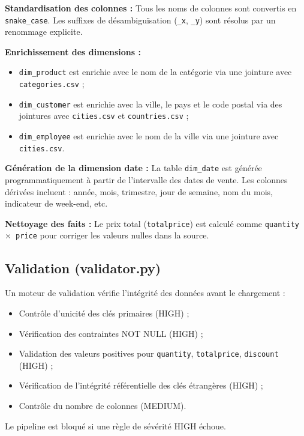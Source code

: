 \documentclass[12pt,a4paper,twoside]{report}
\begin{document}
\textbf{Standardisation des colonnes :} Tous les noms de colonnes sont convertis en \texttt{snake\_case}. Les suffixes de désambiguïsation (\texttt{\_x}, \texttt{\_y}) sont résolus par un renommage explicite.

\textbf{Enrichissement des dimensions :}
\begin{itemize}
  \item \texttt{dim\_product} est enrichie avec le nom de la catégorie via une jointure avec \texttt{categories.csv} ;
  \item \texttt{dim\_customer} est enrichie avec la ville, le pays et le code postal via des jointures avec \texttt{cities.csv} et \texttt{countries.csv} ;
  \item \texttt{dim\_employee} est enrichie avec le nom de la ville via une jointure avec \texttt{cities.csv}.
\end{itemize}

\textbf{Génération de la dimension date :} La table \texttt{dim\_date} est générée programmatiquement à partir de l'intervalle des dates de vente. Les colonnes dérivées incluent : année, mois, trimestre, jour de semaine, nom du mois, indicateur de week-end, etc.

\textbf{Nettoyage des faits :} Le prix total (\texttt{totalprice}) est calculé comme \texttt{quantity $\times$ price} pour corriger les valeurs nulles dans la source.

\subsection{Validation (validator.py)}

Un moteur de validation vérifie l'intégrité des données avant le chargement :

\begin{itemize}
  \item Contrôle d'unicité des clés primaires (HIGH) ;
  \item Vérification des contraintes NOT NULL (HIGH) ;
  \item Validation des valeurs positives pour \texttt{quantity}, \texttt{totalprice}, \texttt{discount} (HIGH) ;
  \item Vérification de l'intégrité référentielle des clés étrangères (HIGH) ;
  \item Contrôle du nombre de colonnes (MEDIUM).
\end{itemize}

Le pipeline est bloqué si une règle de sévérité HIGH échoue.
\end{document}
